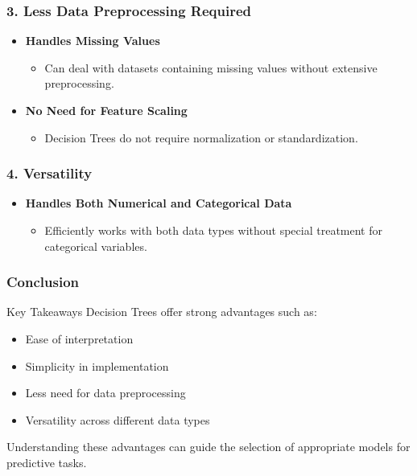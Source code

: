 \documentclass[aspectratio=169]{beamer}
\begin{document}
\begin{frame}[fragile]
    \frametitle{3. Less Data Preprocessing Required}
    \begin{itemize}
        \item \textbf{Handles Missing Values}
            \begin{itemize}
                \item Can deal with datasets containing missing values without extensive preprocessing.
            \end{itemize}
        \item \textbf{No Need for Feature Scaling}
            \begin{itemize}
                \item Decision Trees do not require normalization or standardization.
            \end{itemize}
    \end{itemize}
\end{frame}

\begin{frame}[fragile]
    \frametitle{4. Versatility}
    \begin{itemize}
        \item \textbf{Handles Both Numerical and Categorical Data}
            \begin{itemize}
                \item Efficiently works with both data types without special treatment for categorical variables.
            \end{itemize}
    \end{itemize}
\end{frame}

\begin{frame}[fragile]
    \frametitle{Conclusion}
    \begin{block}{Key Takeaways}
        Decision Trees offer strong advantages such as:
        \begin{itemize}
            \item Ease of interpretation
            \item Simplicity in implementation
            \item Less need for data preprocessing
            \item Versatility across different data types
        \end{itemize}
        Understanding these advantages can guide the selection of appropriate models for predictive tasks.
    \end{block}
\end{frame}
\end{document}
